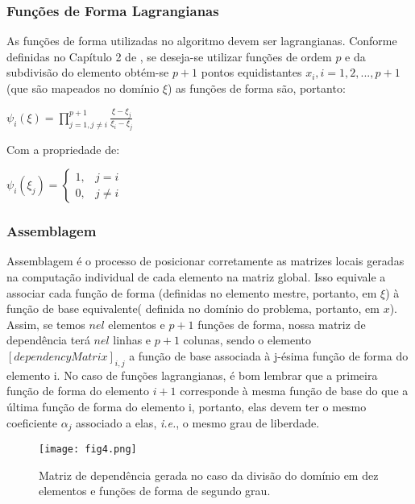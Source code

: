 \documentclass[11pt, oneside, hidelinks]{article}   	%
\begin{document}
\subsubsection{Funções de Forma Lagrangianas}
As funções de forma utilizadas no algoritmo devem ser lagrangianas. Conforme definidas no Capítulo 2 de \citet{oden81}, se deseja-se utilizar funções de ordem $p$ e da subdivisão do elemento obtém-se $p+1$  pontos equidistantes $x_{i},i=1,2,...,p+1$(que são mapeados no domínio $\xi$) as funções de forma são, portanto:

\centerline{$\psi_{i}(\xi)=\prod_{j=1,j\neq i}^{p+1}\frac{\xi-\xi_{j}}{\xi_{i}-\xi_{j}}$} 

Com a propriedade de: 
		
 \centerline{$\psi_{i}(\xi_{j})	=\begin{cases} 
 1, & j=i\\ 
 0, & j\neq i
 \end{cases}	$}		
 \subsubsection{Assemblagem}
 \label{sub:assemblagem}
 Assemblagem é o processo de posicionar corretamente as matrizes locais geradas na computação individual de cada elemento na matriz global. Isso equivale a associar cada função de forma (definidas no elemento mestre, portanto, em $\xi$) à função de base equivalente( definida no domínio do problema, portanto, em $x$). Assim, se temos $nel$ elementos e $p+1$ funções de forma, nossa matriz de dependência terá $nel$ linhas e $p+1$ colunas, sendo o elemento $[dependencyMatrix]_{i,j}$  a função de base associada à j-ésima função de forma do elemento i. No caso de funções lagrangianas, é bom lembrar que a primeira função de forma do elemento $i+1$ corresponde à mesma função de base do que a última função de forma do elemento i, portanto, elas devem ter o mesmo coeficiente $\alpha_{j}$ associado a elas, \emph{i.e.}, o mesmo grau de liberdade.
 \begin{figure}[h!]
  \centering
      \texttt{[image: fig4.png]}
  \caption{Matriz de dependência gerada no caso da divisão do domínio em dez elementos e funções de forma de segundo grau.}
  \label{fig:dependencymatrix}
\end{figure}
\end{document}
